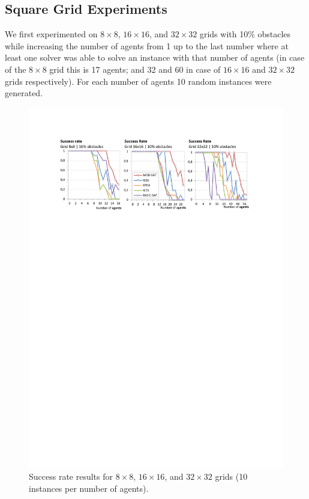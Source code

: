 \documentclass[jair,oneside,11pt]{article}
\begin{document}
\subsection{Square Grid Experiments}

We first experimented on  $8{}\times{}8$, $16{}\times{}16$, and $32{}\times{}32$ grids with 10\% obstacles while increasing the number of agents from 1 up to the last number where at least one solver was able to solve an instance with that number of agents (in case of the $8{}\times{}8$ grid this is 17 agents; and 32 and 60 in case of $16{}\times{}16$ and $32{}\times{}32$ grids respectively). For each number of agents 10 random instances were generated.

\begin{figure}[t]
\centering
\includegraphics[trim={2.5cm 21.0cm 2.5cm 2.6cm},clip,width=\textwidth]{expr_grids-succ-rate.pdf}
\vspace{-0.4cm}
\caption{Success rate results for $8{}\times{}8$, $16{}\times{}16$, and $32{}\times{}32$ grids (10 instances per number of agents).}
\label{expr_grids-succ-rate}
\end{figure}
\end{document}
